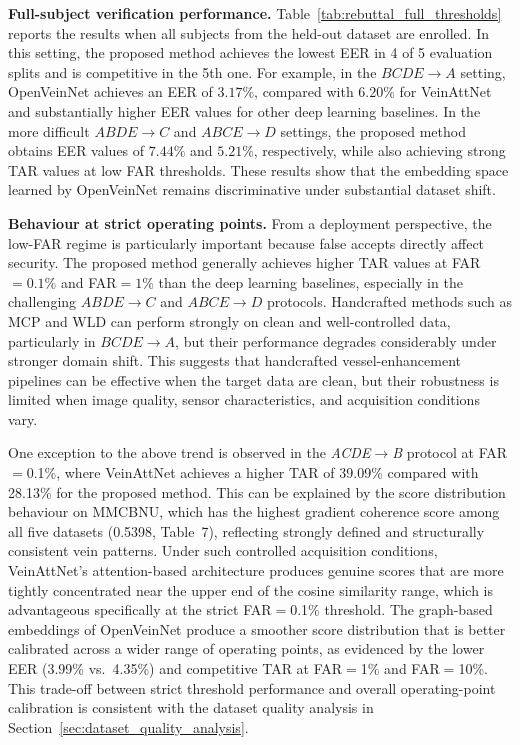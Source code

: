 \documentclass[10pt,journal,compsoc]{IEEEtran}
\begin{document}
\textbf{Full-subject verification performance.}
Table~\ref{tab:rebuttal_full_thresholds} reports the results when all subjects from the held-out dataset are enrolled. In this setting, the proposed method achieves the lowest EER in 4 of 5 evaluation splits and is competitive in the 5th one. For example, in the \(BCDE \rightarrow A\) setting, OpenVeinNet achieves an EER of \(3.17\%\), compared with \(6.20\%\) for VeinAttNet and substantially higher EER values for other deep learning baselines. In the more difficult \(ABDE \rightarrow C\) and \(ABCE \rightarrow D\) settings, the proposed method obtains EER values of \(7.44\%\) and \(5.21\%\), respectively, while also achieving strong TAR values at low FAR thresholds. These results show that the embedding space learned by OpenVeinNet remains discriminative under substantial dataset shift.

\textbf{Behaviour at strict operating points.}
From a deployment perspective, the low-FAR regime is particularly important because false accepts directly affect security. The proposed method generally achieves higher TAR values at FAR$=0.1\%$ and FAR$=1\%$ than the deep learning baselines, especially in the challenging \(ABDE \rightarrow C\) and \(ABCE \rightarrow D\) protocols. Handcrafted methods such as MCP and WLD can perform strongly on clean and well-controlled data, particularly in \(BCDE \rightarrow A\), but their performance degrades considerably under stronger domain shift. This suggests that handcrafted vessel-enhancement pipelines can be effective when the target data are clean, but their robustness is limited when image quality, sensor characteristics, and acquisition conditions vary.

One exception to the above trend is observed in the \textit{ACDE}$\rightarrow$\textit{B}
protocol at FAR$=$0.1\%, where VeinAttNet achieves a higher TAR of 39.09\% compared  with 28.13\% for the proposed method. This can be explained by the score distribution  behaviour on MMCBNU, which has the highest gradient coherence score among all five  datasets (0.5398, Table~7), reflecting strongly defined and structurally consistent vein  patterns. Under such controlled acquisition conditions, VeinAttNet's attention-based
architecture produces genuine scores that are more tightly concentrated near the upper  end of the cosine similarity range, which is advantageous specifically at the strict  FAR$=$0.1\% threshold. The graph-based embeddings of OpenVeinNet produce a smoother score distribution that is better calibrated across a wider range of operating points,
as evidenced by the lower EER (3.99\% vs.\ 4.35\%) and competitive TAR at FAR$=$1\% and FAR$=$10\%. This trade-off between strict threshold performance and overall operating-point calibration is consistent with the dataset quality analysis in Section~\ref{sec:dataset_quality_analysis}.
\end{document}
